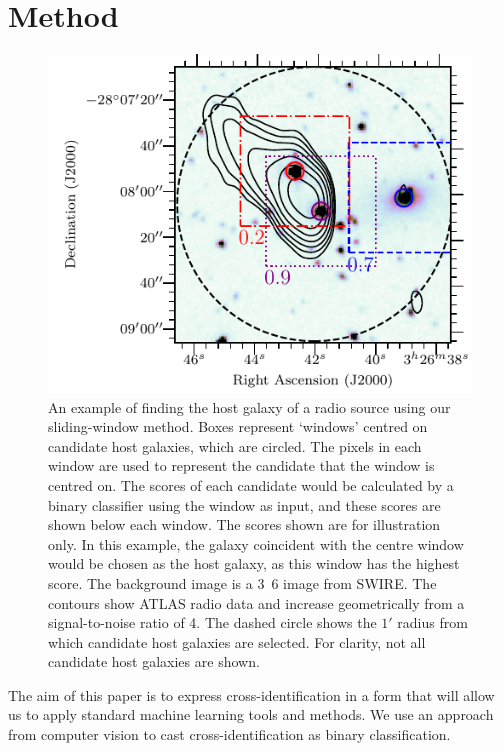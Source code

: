 \documentclass[fleqn,usenatbib,usedcolumn]{mnras}
\newcommand{\edited}[1]{#1}
\begin{document}
  \section{Method}\label{sec:method}
    \begin{figure}
      \centering
      \includegraphics[width=\columnwidth]{images/figure_example_of_method.pdf}
      \caption{An example of \edited{finding} the host galaxy of a radio source using
        our sliding-window method. Boxes represent `windows'
        centred on \edited{candidate host galaxies, which are circled. The pixels in each window are used to represent the candidate that the window is centred
        on. The scores of each candidate would be calculated by a binary classifier using the window as input,
        and these scores are shown below each window}. The scores
        shown are for illustration only. In this example,
        \edited{the galaxy coincident with the centre window would be chosen as the host galaxy, as this
        window has the highest score. The background image is a \unit{3.6}{\micro\meter} image from SWIRE.
        The contours show ATLAS radio data and increase geometrically from a signal-to-noise ratio of 4. The dashed circle
        shows the $1'$ radius from which candidate host galaxies are selected. For clarity, not all candidate host galaxies are shown.}}
      \label{fig:windows}
    \end{figure}

  \edited{The aim of this paper is to express cross-identification in a form that
  will allow us to apply standard machine learning tools and methods. We use an approach from computer vision
  to cast cross-identification as binary classification.}
\end{document}
